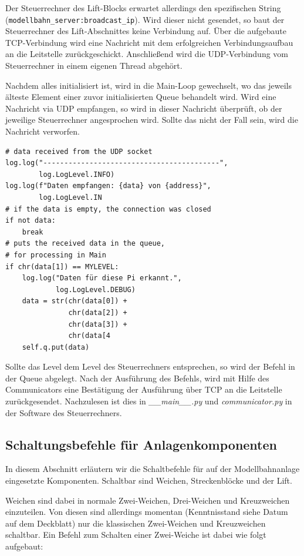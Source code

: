\documentclass{article}
\begin{document}
Der Steuerrechner des Lift-Blocks erwartet allerdings den spezifischen String
\\ (\texttt{modellbahn\_server:broadcast\_ip}).
Wird dieser nicht gesendet, so baut der Steuerrechner des Lift-Abschnittes keine Verbindung auf.
Über die aufgebaute TCP-Verbindung wird eine Nachricht mit dem erfolgreichen Verbindungsaufbau an die Leitstelle zurückgeschickt.
Anschließend wird die UDP-Verbindung vom Steuerrechner in einem eigenen Thread abgehört.

Nachdem alles initialisiert ist, wird in die Main-Loop gewechselt, wo das jeweils älteste Element einer zuvor initialisierten Queue behandelt wird.
Wird eine Nachricht via UDP empfangen, so wird in dieser Nachricht überprüft, ob der jeweilige Steuerrechner angesprochen wird.
Sollte das nicht der Fall sein, wird die Nachricht verworfen.
\begin{verbatim}
# data received from the UDP socket
log.log("------------------------------------------",
        log.LogLevel.INFO)
log.log(f"Daten empfangen: {data} von {address}",
        log.LogLevel.IN
# if the data is empty, the connection was closed
if not data:
    break
# puts the received data in the queue,
# for processing in Main
if chr(data[1]) == MYLEVEL:
    log.log("Daten für diese Pi erkannt.",
            log.LogLevel.DEBUG)
    data = str(chr(data[0]) +
               chr(data[2]) +
               chr(data[3]) +
               chr(data[4
    self.q.put(data)
\end{verbatim}
Sollte das Level dem Level des Steuerrechners entsprechen, so wird der Befehl in der Queue abgelegt.
Nach der Ausführung des Befehls, wird mit Hilfe des Communicators eine Bestätigung der Ausführung über TCP an die Leitstelle zurückgesendet.
Nachzulesen ist dies in \textit{\_\_main\_\_.py} und \textit{communicator.py} in der Software des Steuerrechners.

\subsection{Schaltungsbefehle für Anlagenkomponenten}
In diesem Abschnitt erläutern wir die Schaltbefehle für auf der Modellbahnanlage eingesetzte Komponenten.
Schaltbar sind Weichen, Streckenblöcke und der Lift.

Weichen sind dabei in normale Zwei-Weichen, Drei-Weichen und Kreuzweichen einzuteilen.
Von diesen sind allerdings momentan (Kenntnisstand siehe Datum auf dem Deckblatt) nur die klassischen Zwei-Weichen und Kreuzweichen schaltbar.
Ein Befehl zum Schalten einer Zwei-Weiche ist dabei wie folgt aufgebaut:
\end{document}
